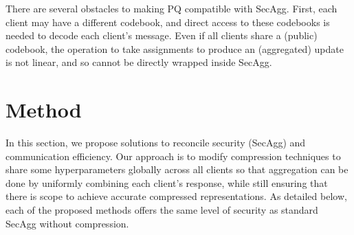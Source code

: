 \documentclass[11pt]{article}
\newcommand{\SecAgg}{{\sc SecAgg}\xspace}
\newcommand{\modif}[1]{{\color{black}#1}}
\begin{document}
There are several obstacles to making PQ compatible with \SecAgg.
First, each client may have a different codebook, and direct access to these codebooks is needed to decode each client's message.
Even if all clients share a (public) codebook, the operation to take assignments to produce an (aggregated) update is not linear, and so cannot be directly wrapped inside \SecAgg.



\section{Method}
\label{sec:method}

In this section, we propose solutions to
reconcile security (\SecAgg) and communication efficiency.
Our approach is to modify compression techniques to share some hyperparameters globally across all clients so that aggregation can be done by uniformly combining each client's response, while still ensuring that there is scope to achieve accurate compressed representations.
\modif{As detailed below, each of the proposed methods offers the same level of security as standard \SecAgg without compression.}
\end{document}
